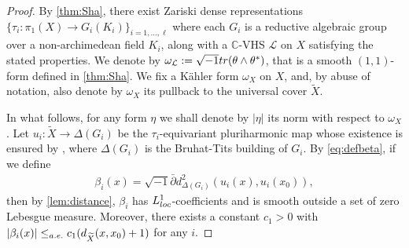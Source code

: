 \documentclass[11pt,a4paper,english]{smfart}
\theoremstyle{plain}
\theoremstyle{definition}
\theoremstyle{plain}
\def\hess{\sqrt{-1}\partial\bar{\partial}}
\def\db{\bar{\partial}}
\def\bC{\mathbb{C}}
\def\cL{\mathcal{L}}
\def\xsp{X^{\rm sp}}
\begin{document}
	\begin{proof} 
By \cref{thm:Sha}, there exist	Zariski dense   representations $\{\tau_i:\pi_1(X)\to G_i(K_i)\}_{i=1,\ldots,\ell}$  where each $G_i$  is a reductive algebraic group over a non-archimedean field $K_i$, along with a $\bC$-VHS $\cL$  on $X$ satisfying the stated properties.   
We denote by $\omega_\cL:=\sqrt{-1}{\rm tr}(\theta\wedge\theta^*)$, that  is a smooth $(1,1)$-form defined in \cref{thm:Sha}.  We fix a K\"ahler form $\omega_X$ on $X$, and, by abuse of notation, also denote by $\omega_X$ its pullback to the universal cover $\widetilde{X}$.
		
	 In what follows, for any form $\eta$ we shall denote by $|\eta|$ its norm with respect to $\omega_X$.   		Let $u_i:\widetilde{X}\to \Delta(G_i)$ be the $\tau_i$-equivariant pluriharmonic map whose existence is ensured by \cite{GS92}, where $\Delta(G_i)$ is the Bruhat-Tits building of $G_i$.  By \eqref{eq:defbeta},  if we define
		\begin{align}\label{eq:beta}
		\beta_i(x)=\sqrt{-1} \db d^2_{\Delta(G_i)}(u_i(x),u_i(x_0)),
		\end{align}   then  by \cref{lem:distance}, $\beta_i$ has $L_{\rm loc}^1$-coefficients and  is  smooth outside a set of zero Lebesgue measure.  Moreover,     there exists a constant $c_1>0$  with 
		$
	|\beta_i(x)|\leq_{\rm a.e.}c_1 (d_{\widetilde{X}}(x,x_0)+1) 
		$  
		for any $i$. 
	

\end{proof}
\end{document}

